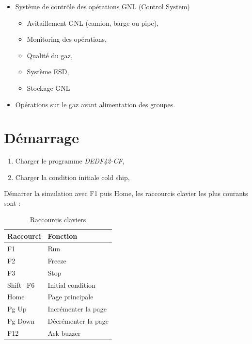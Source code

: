 \documentclass[12pt,a4paper]{article}
\begin{document}
\begin{itemize}
    \item Système de contrôle des opérations GNL (Control System)
    \begin{itemize}
        \item Avitaillement GNL (camion, barge ou pipe),
        \item Monitoring des opérations,
        \item Qualité du gaz,
        \item Système ESD,
    \item Stockage GNL
    \end{itemize}
    \item Opérations sur le gaz avant alimentation des groupes.
 \end{itemize}

 \section{Démarrage}
\begin{enumerate}
 \item Charger le programme \emph{DEDF42-CF},
 \item Charger la condition initiale cold ship,
\end{enumerate}

Démarrer la simulation avec F1 puis Home, les raccourcis clavier les plus courants sont :

 

    \begin{table}[htbp]
    \centering
    \footnotesize
        \begin{tabular}{|l|l|}
        \hline
        Raccourci & Fonction \\ \hline
        F1 & Run \\ \hline
        F2 & Freeze \\ \hline
        F3 & Stop \\ \hline
        Shift+F6 & Initial condition \\ \hline
        Home & Page principale \\ \hline
        Pg Up & Incrémenter la page \\ \hline
        Pg Down & Décrémenter la page \\ \hline
        F12 & Ack buzzer \\ \hline
        \end{tabular}
    \label{Raccourcis clavier}
    \caption{Raccourcis claviers}
    \end{table}
\end{document}
